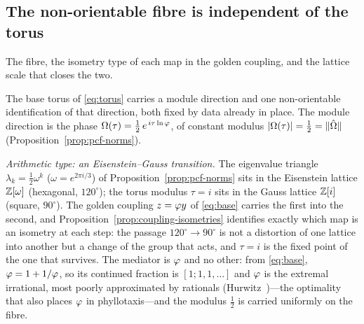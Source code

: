 
\subsection{The non-orientable fibre is independent of the torus}\label{ssec:mobius-torus}

The fibre, the isometry type of each map in the golden coupling, and the lattice scale that closes
the two.

The base torus of \eqref{eq:torus} carries a module direction and one non-orientable
identification of that direction, both fixed by data already in place. The module direction
is the phase $\Omega(\tau)=\tfrac12\,e^{\,i\tau\ln\varphi}$, of constant modulus
$|\Omega(\tau)|=\tfrac12=\|\hat{\Omega}\|$ (Proposition~\ref{prop:pcf-norms}).

\emph{Arithmetic type: an Eisenstein--Gauss transition.} The eigenvalue triangle
$\lambda_k=\tfrac12\omega^{k}$ ($\omega=e^{2\pi i/3}$) of Proposition~\ref{prop:pcf-norms}
sits in the Eisenstein lattice $\mathbb{Z}[\omega]$ (hexagonal, $120^{\circ}$); the torus modulus
$\tau=i$ sits in the Gauss lattice $\mathbb{Z}[i]$ (square, $90^{\circ}$). The golden coupling
$z=\varphi y$ of \eqref{eq:base} carries the first into the second, and
Proposition~\ref{prop:coupling-isometries} identifies exactly which map is an isometry at each
step: the passage $120^{\circ}\to90^{\circ}$ is not a distortion of one lattice into another but a
change of the group that acts, and $\tau=i$ is the fixed point of the one that survives. The mediator is $\varphi$ and no other: from \eqref{eq:base},
$\varphi=1+1/\varphi$, so its continued fraction is $[1;1,1,\dots]$ and $\varphi$ is the
extremal irrational, most poorly approximated by rationals (Hurwitz~\cite{Hurwitz1891})---the
optimality that also places $\varphi$ in phyllotaxis---and the modulus $\tfrac12$ is carried
uniformly on the fibre.

